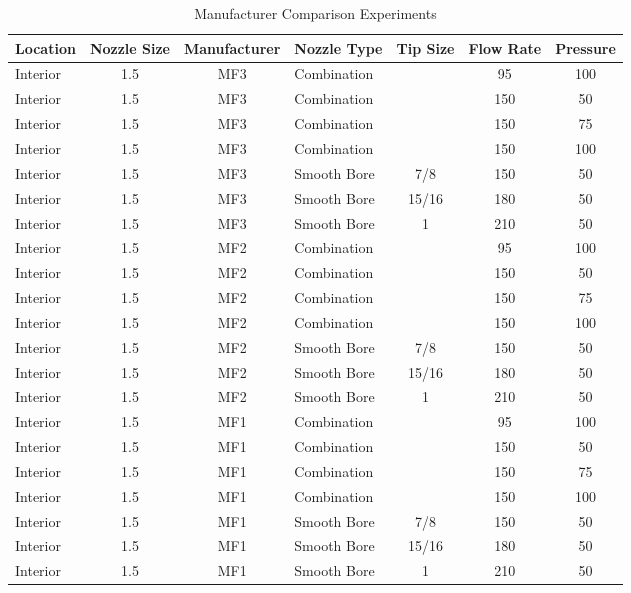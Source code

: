 \documentclass{article}
\begin{document}
\begin{table}[!ht]
\centering
\caption{Manufacturer Comparison Experiments}
\label{Manufacturer_Comparison_Experiments}
\begin{tabular}{lcclccc}
\toprule[1.5pt]
{\textbf{Location}} & {\textbf{Nozzle Size}} & {\textbf{Manufacturer}} & {\textbf{Nozzle Type}} & {\textbf{Tip Size}} & {\textbf{Flow Rate}} & \textbf{Pressure} \\ 
\midrule
Interior & 1.5 & MF3 & Combination &  & 95 & 100 \\
Interior & 1.5 & MF3 & Combination &  & 150 & 50 \\
Interior & 1.5 & MF3 & Combination &  & 150 & 75 \\
Interior & 1.5 & MF3 & Combination &  & 150 & 100 \\
Interior & 1.5 & MF3 & Smooth Bore & 7/8 & 150 & 50 \\
Interior & 1.5 & MF3 & Smooth Bore & 15/16 & 180 & 50 \\
Interior & 1.5 & MF3 & Smooth Bore & 1 & 210 & 50 \\
Interior & 1.5 & MF2 & Combination &  & 95 & 100 \\
Interior & 1.5 & MF2 & Combination &  & 150 & 50 \\
Interior & 1.5 & MF2 & Combination &  & 150 & 75 \\
Interior & 1.5 & MF2 & Combination &  & 150 & 100 \\
Interior & 1.5 & MF2 & Smooth Bore & 7/8 & 150 & 50 \\
Interior & 1.5 & MF2 & Smooth Bore & 15/16 & 180 & 50 \\
Interior & 1.5 & MF2 & Smooth Bore & 1 & 210 & 50 \\
Interior & 1.5 & MF1 & Combination &  & 95 & 100 \\
Interior & 1.5 & MF1 & Combination &  & 150 & 50 \\
Interior & 1.5 & MF1 & Combination &  & 150 & 75 \\
Interior & 1.5 & MF1 & Combination &  & 150 & 100 \\
Interior & 1.5 & MF1 & Smooth Bore & 7/8 & 150 & 50 \\
Interior & 1.5 & MF1 & Smooth Bore & 15/16 & 180 & 50 \\
Interior & 1.5 & MF1 & Smooth Bore & 1 & 210 & 50 \\ 
\bottomrule[1.25pt]
\end{tabular}
\end{table}

\clearpage
\end{document}
